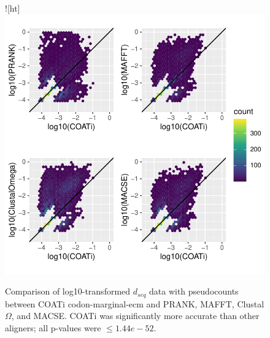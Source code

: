 \begin{figure}![ht]
    \centering
    \includegraphics{chapter2/appendix-figures/dseq_plots_mar-ecm.pdf} 
    \caption[$d_{seq}$ Marginal-ECM]{Comparison of log10-transformed $d_{seq}$ data with pseudocounts between COATi codon-marginal-ecm and PRANK, MAFFT, Clustal$\Omega$, and MACSE. COATi was significantly more accurate than other aligners; all p-values were $\leq 1.44e-52$.}
    \label{fig:dseq-mar-ecm}
\end{figure}

\clearpage



